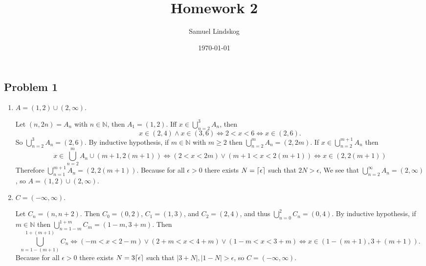 \documentclass{article}
\title{Homework 2}
\author{Samuel Lindskog}
\date\today
\DeclarePairedDelimiter{\ceil}{\lceil}{\rceil}
\begin{document}
\maketitle %

\subsection*{Problem 1}
\begin{enumerate}[label=(\alph*)]
	\item \(A=(1,2)\cup(2,\infty)\).
		\begin{IEEEproof}
		Let \((n,2n)=A_n\) with \(n\in\mathbb{N}\), then \(A_1=(1,2)\). Iff \(x\in\bigcup_{n=2}^{3}A_n\), then 
		\begin{equation*}
			x\in (2,4)\wedge x\in(3,6) \Leftrightarrow 2<x<6\Leftrightarrow x\in (2,6).
		\end{equation*}
			So \(\bigcup_{n=2}^{3}A_n=(2,6)\). By inductive hypothesis, if \(m \in\mathbb{N}\) with \(m\geq 2\) then \(\bigcup_{n=2}^{m}A_n=(2,2m)\). If \(x\in\bigcup_{n=2}^{m+1}A_n\) then
			\begin{equation*}
			x\in\bigcup_{n=2}^{m}A_n\cup (m+1, 2(m+1))\Leftrightarrow(2<x<2m)\vee(m+1<x<2(m+1))
			\Leftrightarrow x\in(2,2(m+1))
		\end{equation*}
			Therefore \(\bigcup_{n=1}^{m+1}A_n=(2,2(m+1))\). Because for all \(\epsilon>0\) there exists \(N=\ceil{\epsilon}\) such that \(2N>\epsilon\), We see that \(\bigcup_{n=2}^{\infty}A_n=(2,\infty)\), so \(A=(1,2)\cup(2,\infty)\).
\end{IEEEproof}
	\item \(C=(-\infty, \infty)\).
		\begin{IEEEproof}
			Let \(C_n=(n,n+2)\). Then \(C_0=(0,2)\), \(C_1=(1,3)\), and \(C_2=(2,4)\), and thus \(\bigcup_{n=0}^{2}C_n=(0,4)\). By inductive hypothesis, if \(m\in\mathbb{N}\) then \(\bigcup_{n=1-m}^{1+m}C_m=(1-m, 3+m)\). Then
			\begin{equation*}
				\bigcup_{n=1-(m+1)}^{1+(m+1)}C_n\Leftrightarrow
				(-m<x<2-m)\vee(2+m<x<4+m)\vee(1-m<x<3+m)\Leftrightarrow x\in(1-(m+1),3+(m+1)).
			\end{equation*}
			Because for all \(\epsilon>0\) there exists \(N=3\ceil{\epsilon}\) such that \(\lvert 3+N\rvert,\lvert 1-N\rvert>\epsilon\), so \(C=(-\infty,\infty)\).
		\end{IEEEproof}
\end{enumerate}
\end{document}
